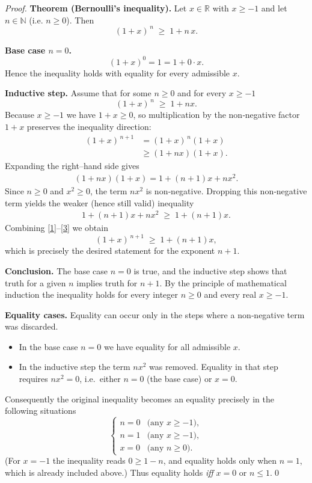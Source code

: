 \begin{proof}
\textbf{Theorem (Bernoulli’s inequality).}  
Let $x\in\mathbb R$ with $x\ge-1$ and let $n\in\mathbb N$ (i.e. $n\ge0$). Then
\[
(1+x)^{\,n}\;\ge\;1+n\,x .
\]

\medskip
\textbf{Base case $n=0$.}
\[
(1+x)^{0}=1=1+0\cdot x .
\]
Hence the inequality holds with equality for every admissible $x$.

\medskip
\textbf{Inductive step.}  
Assume that for some $n\ge0$ and for every $x\ge-1$
\begin{equation*}
(1+x)^{\,n}\;\ge\;1+n x .\tag{IH}
\end{equation*}
Because $x\ge-1$ we have $1+x\ge0$, so multiplication by the non‑negative factor $1+x$ preserves the inequality direction:
\begin{align*}
(1+x)^{\,n+1}
   &=(1+x)^{\,n}(1+x)\\
   &\ge (1+n x)(1+x). \tag{1}
\end{align*}
Expanding the right–hand side gives
\begin{align*}
(1+n x)(1+x)=1+(n+1)x+n x^{2}. \tag{2}
\end{align*}
Since $n\ge0$ and $x^{2}\ge0$, the term $n x^{2}$ is non‑negative. Dropping this non‑negative term yields the weaker (hence still valid) inequality
\begin{align*}
1+(n+1)x+n x^{2}\;\ge\;1+(n+1)x .\tag{3}
\end{align*}
Combining \eqref{1}–\eqref{3} we obtain
\[
(1+x)^{\,n+1}\;\ge\;1+(n+1)x ,
\]
which is precisely the desired statement for the exponent $n+1$.

\medskip
\textbf{Conclusion.}  
The base case $n=0$ is true, and the inductive step shows that truth for a given $n$ implies truth for $n+1$. By the principle of mathematical induction the inequality holds for every integer $n\ge0$ and every real $x\ge-1$.

\medskip
\textbf{Equality cases.}  
Equality can occur only in the steps where a non‑negative term was discarded.

\begin{itemize}
\item In the base case $n=0$ we have equality for all admissible $x$.
\item In the inductive step the term $n x^{2}$ was removed. Equality in that step requires $n x^{2}=0$, i.e.\ either $n=0$ (the base case) or $x=0$.
\end{itemize}
Consequently the original inequality becomes an equality precisely in the following situations
\[
\begin{cases}
n=0 &\text{(any }x\ge-1),\\[4pt]
n=1 &\text{(any }x\ge-1),\\[4pt]
x=0 &\text{(any }n\ge0).
\end{cases}
\]
(For $x=-1$ the inequality reads $0\ge 1-n$, and equality holds only when $n=1$, which is already included above.)  
Thus equality holds \emph{iff} $x=0$ or $n\le1$.\qed
\end{proof}